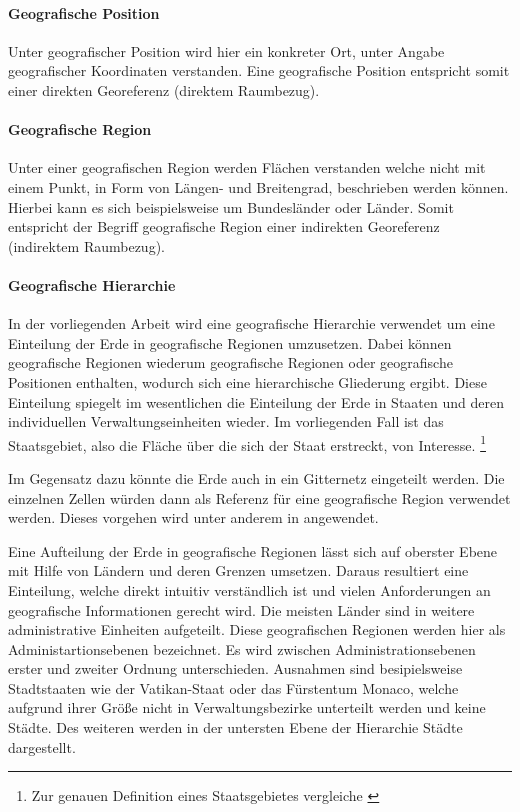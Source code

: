 		\paragraph*{Geografische Position}
		Unter geografischer Position wird hier ein konkreter Ort, unter Angabe geografischer Koordinaten verstanden.
		Eine geografische Position entspricht somit einer direkten Georeferenz (direktem Raumbezug).

		\paragraph*{Geografische Region} 
		Unter einer geografischen Region werden Flächen verstanden welche nicht mit einem Punkt, in Form von Längen- und Breitengrad, beschrieben werden können. 
		Hierbei kann es sich beispielsweise um Bundesländer oder Länder.
		Somit entspricht der Begriff geografische Region einer indirekten Georeferenz (indirektem Raumbezug).

		\paragraph*{Geografische Hierarchie} \label{par: geografische Hierarchie} 
		In der vorliegenden Arbeit wird eine geografische Hierarchie verwendet um eine Einteilung der Erde in geografische Regionen umzusetzen.
		Dabei können geografische Regionen wiederum geografische Regionen oder geografische Positionen enthalten, wodurch sich eine hierarchische Gliederung ergibt.
		Diese Einteilung spiegelt im wesentlichen die Einteilung der Erde in Staaten und deren individuellen Verwaltungseinheiten wieder.
		Im vorliegenden Fall ist das Staatsgebiet, also die Fläche über die sich der Staat erstreckt, von Interesse. \footnote{Zur genauen Definition eines Staatsgebietes vergleiche \cite{jellinek1921}} 

		Im Gegensatz dazu könnte die Erde auch in ein Gitternetz eingeteilt werden. 
		Die einzelnen Zellen würden dann als Referenz für eine geografische Region verwendet werden.
		Dieses vorgehen wird unter anderem in \cite{Serdyukov2009} angewendet.

		Eine Aufteilung der Erde in geografische Regionen lässt sich auf oberster Ebene mit Hilfe von Ländern und deren Grenzen umsetzen. 
		Daraus resultiert eine Einteilung, welche direkt intuitiv verständlich ist und vielen Anforderungen an geografische Informationen gerecht wird.
		Die meisten Länder sind in weitere administrative Einheiten aufgeteilt.
		Diese geografischen Regionen werden hier als Administartionsebenen bezeichnet.
		Es wird zwischen Administrationsebenen erster und zweiter Ordnung unterschieden. 
		Ausnahmen sind besipielsweise Stadtstaaten wie der Vatikan-Staat oder das Fürstentum Monaco, welche aufgrund ihrer Größe nicht in Verwaltungsbezirke unterteilt werden und keine Städte.
		Des weiteren werden in der untersten Ebene der Hierarchie Städte dargestellt.

